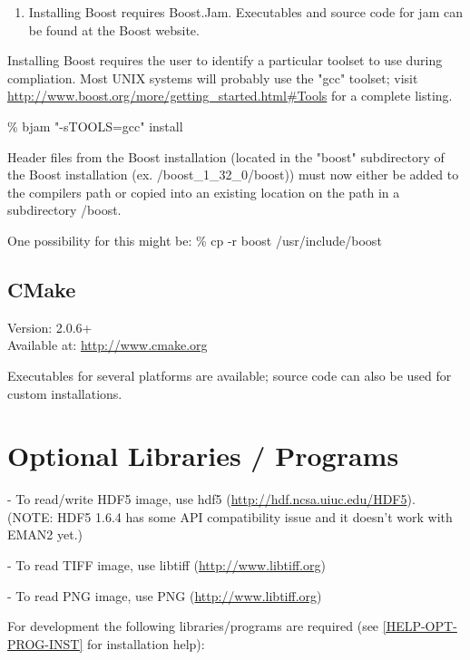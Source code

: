   \begin{enumerate}
    \item
      Installing Boost requires Boost.Jam.  Executables and
      source code for jam can be found at the Boost website.
  \end {enumerate}

  Installing Boost requires the user to identify a particular
  toolset to use during compliation.  Most UNIX systems will
  probably use the "gcc" toolset; visit
  \href{http://www.boost.org/more/getting\_started.html\#Tools}{http://www.boost.org/more/getting\_started.html\#Tools}
  for a complete listing.        

  \% bjam "-sTOOLS=gcc" install 

  Header files from the Boost installation (located in the
  "boost" subdirectory of the Boost installation
  (ex. /boost\_1\_32\_0/boost)) must now either be added to the
  compilers path or copied into an existing location on the path
  in a subdirectory /boost.

  One possibility for this might be:
  \% cp -r boost /usr/include/boost
      
  
\subsection{CMake}
  Version: 2.0.6+\\
  Available at: \href{http://www.cmake.org}{http://www.cmake.org}
    

       Executables for several platforms are available; source code
       can also be used for custom installations.


\section{Optional Libraries / Programs} 
\label{OPTIONAL-LIBRARIES} 

  - To read/write HDF5 image, use hdf5 (\href{http://hdf.ncsa.uiuc.edu/HDF5}{http://hdf.ncsa.uiuc.edu/HDF5}).
	  (NOTE: HDF5 1.6.4 has some API compatibility issue and it doesn't work	        with EMAN2 yet.)
	  
    - To read TIFF image, use libtiff (\href{http://www.libtiff.org}{http://www.libtiff.org})

    - To read PNG image, use PNG (\href{http://www.libpng.org}{http://www.libtiff.org})

    For development the following libraries/programs are required (see
    \ref{HELP-OPT-PROG-INST} for installation help):

